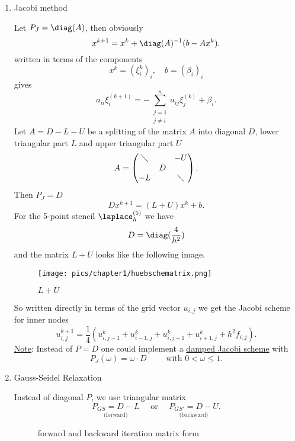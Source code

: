 \begin{enumerate}[label=\Alph{enumi})]
	\item Jacobi method 

		Let $P_{J} = \diag(A)$, then obviously
		\[
			x^{k+1} = x^{k} + \diag(A)^{-1}(b-Ax^{k})
		.\] 
		written in terms of the components
		\[
			x^{k}= (\xi _{i}^{k})_{i}, \quad b=(\beta_{i})_{i}
		\] 
		gives
		\[
			a_{ii}\xi _{i}^{(k+1)} = -\sum_{\substack{j=1 \\ j \neq i}}^{n}{a_{ij}\xi _{j}^{(k)}+ \beta_{i}}
		.\] 
		Let $A=D-L-U$ be a splitting of the matrix $A$ into diagonal $D$, lower triangular part $L$ and upper triangular part $U$
		\[
		A = \begin{pmatrix}
			\diagdown & & -U \\
			  &D&    \\
			-L & & \diagdown
		\end{pmatrix}
		.\] 
		Then $P_{J} = D$
		\[
			Dx^{k+1} = (L+U)x^{k} + b
		.\] 
		For the 5-point stencil $\laplace_{h}^{(5)}$ we have 
		\[
			D = \diag(\frac{4}{h^{2}}) 		
		\] 
		and the matrix $L+U$ looks like the following image.
		\begin{figure}[H]
			\begin{center}
				\texttt{[image: pics/chapter1/huebschematrix.png]}
			\end{center}
			\caption{$L+U$}
			\label{fig:huebschematrix}
		\end{figure}
		
		So written directly in terms of the grid vector $u_{i,j}$ we get the Jacobi scheme for inner nodes
		\[
			u_{i,j}^{k+1} = \frac{1}{4}(u_{i,j-1}^{k}+ u_{i-1,j}^{k} + u_{i,j+1}^{k} + u_{i+1,j}^{k} + h^{2}f_{i,j})
		.\] 
		\underline{Note}: Instead of $P=D$ one could implement a \underline{damped Jacobi scheme} with
		\[
			P_{J}(\omega )=\omega \cdot D \qquad \text{ with } 0 < \omega \leq 1
		.\] 
	\item Gauss-Seidel Relaxation

		Instead of diagonal $P$, we use triangular matrix
		\[
			\underset{\text{ (forward) }}{P_{GS} = D-L} \quad\text{ or }\quad \underset{\text{ (backward) }}{P_{GS'}=D-U}
		.\] 
		\begin{figure}[H]
			\begin{center}
				
			\end{center}
			\caption{forward and backward iteration matrix form}
			\label{fig:forwardbackward}
		\end{figure}
		

\end{enumerate}

